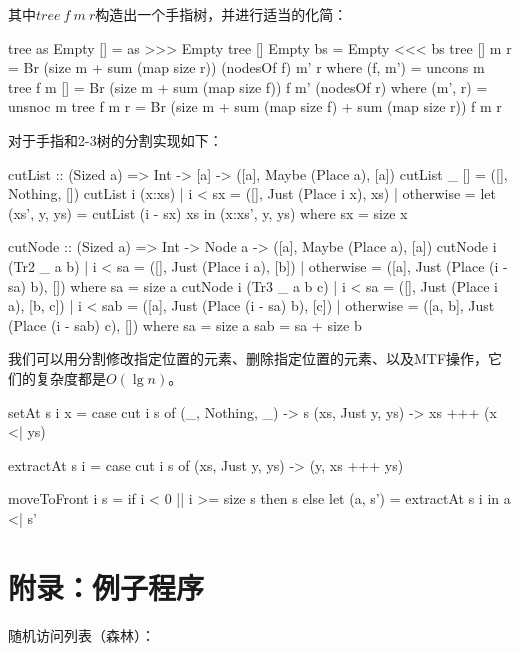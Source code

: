 \documentclass[b5paper]{ctexart}
\begin{document}
\begin{Answer}[ref = {ex:finger-tree-index}]
{其中$tree\ f\ m\ r$构造出一个手指树，并进行适当的化简：

\begin{Haskell}
tree as Empty [] = as >>> Empty
tree [] Empty bs = Empty <<< bs
tree [] m r = Br (size m + sum (map size r)) (nodesOf f) m' r
    where (f, m') = uncons m
tree f m [] = Br (size m + sum (map size f)) f m' (nodesOf r)
    where (m', r) = unsnoc m
tree f m r = Br (size m + sum (map size f) + sum (map size r)) f m r
\end{Haskell}

对于手指和2-3树的分割实现如下：

\begin{Haskell}
cutList :: (Sized a) => Int -> [a] -> ([a], Maybe (Place a), [a])
cutList _ [] = ([], Nothing, [])
cutList i (x:xs) | i < sx = ([], Just (Place i x), xs)
                 | otherwise = let (xs', y, ys) = cutList (i - sx) xs
                               in (x:xs', y, ys)
  where sx = size x

cutNode :: (Sized a) => Int -> Node a -> ([a], Maybe (Place a), [a])
cutNode i (Tr2 _ a b) | i < sa = ([], Just (Place i a), [b])
                      | otherwise = ([a], Just (Place (i - sa) b), [])
  where sa = size a
cutNode i (Tr3 _ a b c) | i < sa = ([], Just (Place i a), [b, c])
                        | i < sab = ([a], Just (Place (i - sa) b), [c])
                        | otherwise = ([a, b], Just (Place (i - sab) c), [])
  where sa = size a
        sab = sa + size b
\end{Haskell}

我们可以用分割修改指定位置的元素、删除指定位置的元素、以及MTF操作，它们的复杂度都是$O(\lg n)$。

\begin{Haskell}
setAt s i x = case cut i s of
  (_, Nothing, _) -> s
  (xs, Just y, ys) -> xs +++ (x <| ys)

extractAt s i = case cut i s of (xs, Just y, ys) -> (y, xs +++ ys)

moveToFront i s = if i < 0 || i >= size s then s
                  else let (a, s') = extractAt s i in a <| s'
\end{Haskell}
}
\end{Answer}

\section{附录：例子程序}

随机访问列表（森林）：
\end{document}
